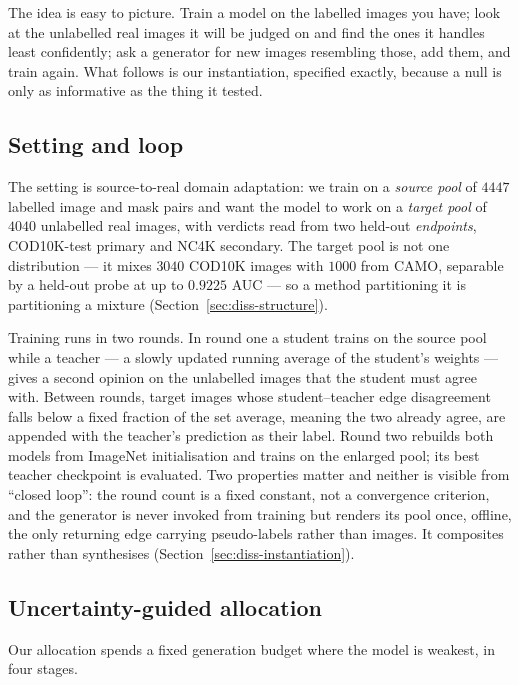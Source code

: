 \documentclass{article} %
\begin{document}
The idea is easy to picture. Train a model on the labelled images you have; look at the unlabelled
real images it will be judged on and find the ones it handles least confidently; ask a generator for
new images resembling those, add them, and train again. What follows is our instantiation, specified
exactly, because a null is only as informative as the thing it tested.

\subsection{Setting and loop}
\label{sec:method-setting}

The setting is source-to-real domain adaptation: we train on a \emph{source pool} of $4447$ labelled
image and mask pairs and want the model to work on a \emph{target pool} of $4040$ unlabelled real
images, with verdicts read from two held-out \emph{endpoints}, COD10K-test primary and NC4K
secondary. The target pool is not one distribution --- it mixes $3040$ COD10K images with $1000$ from
CAMO, separable by a held-out probe at up to $0.9225$ AUC --- so a method partitioning it is
partitioning a mixture (Section~\ref{sec:diss-structure}).

Training runs in two rounds. In round one a student trains on the source pool while a teacher --- a
slowly updated running average of the student's weights --- gives a second opinion on the unlabelled
images that the student must agree with. Between rounds, target images whose student--teacher edge
disagreement falls below a fixed fraction of the set average, meaning the two already agree, are
appended with the teacher's prediction as their label. Round two rebuilds both models from ImageNet
initialisation and trains on the enlarged pool; its best teacher checkpoint is evaluated. Two properties matter and neither is visible from ``closed loop'': the round count is a
fixed constant, not a convergence criterion, and the generator is never invoked from training but
renders its pool once, offline, the only returning edge carrying pseudo-labels rather than images.
It composites rather than synthesises
(Section~\ref{sec:diss-instantiation}).

\subsection{Uncertainty-guided allocation}
\label{sec:method-allocation}

Our allocation spends a fixed generation budget where the model is weakest, in four stages.
\end{document}
